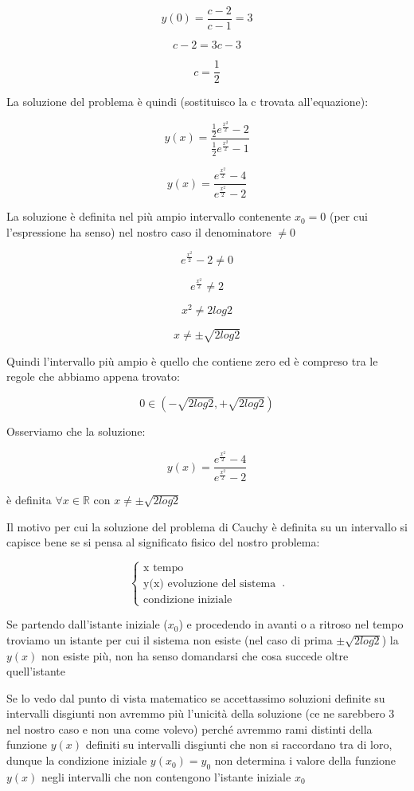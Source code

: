 \documentclass[../appunti-analisi.tex]{subfiles}
\begin{document}
\[
    y(0) = \frac{c-2}{c-1} = 3
\]

\[
    c-2 = 3c -3
\]

\[
    c = \frac{1}{2} 
\]

La soluzione del problema è quindi (sostituisco la c trovata all'equazione):

\[
    y(x) = \frac{\frac{1}{2} e ^{\frac{x ^{2}}{2} }-2}{\frac{1}{2} e ^{\frac{x ^{2}}{2} }-1} 
\]

\[
    y(x) = \frac{ e ^{\frac{x ^{2}}{2} }-4}{ e ^{\frac{x ^{2}}{2} }-2} 
\]

La soluzione è definita nel più ampio intervallo contenente $x_0 = 0 $ (per cui l'espressione ha senso) nel nostro caso il denominatore $\neq 0$

\[
    e ^{\frac{x ^{2}}{2} } - 2 \neq 0
\]

\[
    e ^{\frac{x ^{2}}{2} }  \neq 2
\]

\[
    x ^{2} \neq 2 log 2
\]

\[
    x \neq \pm \sqrt{2 log2}
\]

Quindi l'intervallo più ampio è quello che contiene zero ed è compreso tra le regole che abbiamo appena trovato:

\[
    0 \in (-\sqrt{2log2},+\sqrt{2log2}) 
\]

Osserviamo che la soluzione:

\[
    y(x) = \frac{ e ^{\frac{x ^{2}}{2} }-4}{ e ^{\frac{x ^{2}}{2} }-2} 
\]

è definita $\forall x \in \mathbb{R}$ con $x \neq \pm \sqrt{2log2}$


Il motivo per cui la soluzione del problema di Cauchy è definita su un intervallo si capisce bene se si pensa al significato fisico del nostro problema:

\begin{equation}
    \begin{cases}
        \text{x tempo}\\
        \text{y(x) evoluzione del sistema}\\
        \text{condizione iniziale}
    \end{cases}\,.
\end{equation}

Se partendo dall'istante iniziale ($x_0$) e procedendo in avanti o a ritroso nel tempo troviamo un istante per cui il sistema non esiste (nel caso di prima $\pm \sqrt{2log2}$) la $y(x)$ non esiste più, non ha senso domandarsi che cosa succede oltre quell'istante

Se lo vedo dal punto di vista matematico se accettassimo soluzioni definite su intervalli disgiunti non avremmo più l'unicità della soluzione (ce ne sarebbero 3 nel nostro caso e non una come volevo) perché avremmo rami distinti della funzione $y(x)$ definiti su intervalli disgiunti che non si raccordano tra di loro, dunque la condizione iniziale $y(x_0) = y_0$ non determina i valore della funzione $y(x)$ negli intervalli che non contengono l'istante iniziale $x_0$
\end{document}
